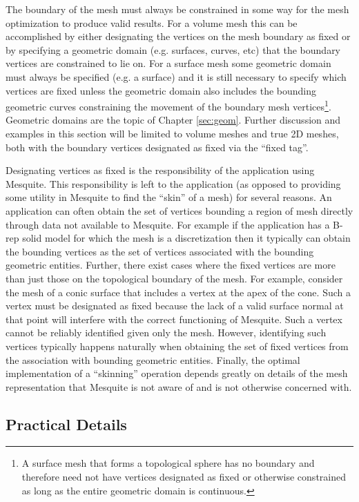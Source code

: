The boundary of the mesh must always be constrained in some way for the mesh optimization to produce valid results.  For a volume mesh this can be accomplished by either designating the vertices on the mesh boundary as fixed or by specifying a geometric domain (e.g. surfaces, curves, etc) that the boundary vertices are constrained to lie on.  For a surface mesh some geometric domain must always be specified (e.g. a surface) and it is still necessary to specify which vertices are fixed unless the geometric domain also includes the bounding geometric curves constraining the movement of the boundary mesh vertices\footnote{A surface mesh that forms a topological sphere has no boundary and therefore need not have vertices designated as fixed or otherwise constrained as long as the entire geometric domain is continuous.}.  Geometric domains are the topic of Chapter \ref{sec:geom}.  Further discussion and examples in this section will be limited to volume meshes and true 2D meshes, both with the boundary vertices designated as fixed via the ``fixed tag''. 

Designating vertices as fixed is the responsibility of the application using Mesquite.  This responsibility is left to the application (as opposed to providing some utility in Mesquite to find the ``skin'' of a mesh) for several reasons.  An application can often obtain the set of vertices bounding a region of mesh directly through data not available to Mesquite.  For example if the application has a B-rep solid model for which the mesh is a discretization then it typically can obtain the bounding vertices as the set of vertices associated with the bounding geometric entities.  Further, there exist cases where the fixed vertices are more than just those on the topological boundary of the mesh.  For example, consider the mesh of a conic surface that includes a vertex at the apex of the cone.  Such a vertex must be designated as fixed because the lack of a valid surface normal at that point will interfere with the correct functioning of Mesquite.  Such a vertex cannot be reliably identified given only the mesh.  However, identifying such vertices typically happens naturally when obtaining the set of fixed vertices from the association with bounding geometric entities.  Finally, the optimal implementation of a ``skinning'' operation depends greatly on details of the mesh representation that Mesquite is not aware of and is not otherwise concerned with.

\subsection{Practical Details}

